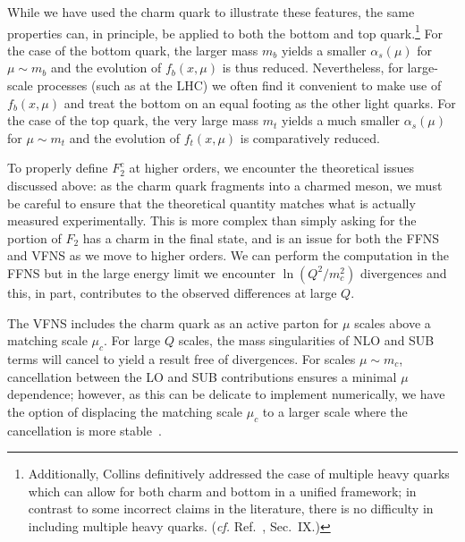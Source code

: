 %
While we have used the charm quark to illustrate these features, the
same properties can, in principle, be applied to both the bottom and
top quark.\footnote{Additionally, Collins definitively addressed the
  case of multiple heavy quarks which can allow for both charm and
  bottom in a unified framework; in contrast to some incorrect claims
  in the literature, there is no difficulty in including multiple
  heavy quarks. (\textit{cf.} Ref.~\cite{Collins:1998rz}, Sec.~IX.)}
For the case of the bottom quark, the larger mass $m_{b}$ yields a
smaller $\alpha_{s}(\mu)$ for $\mu\sim m_{b}$ and the evolution of
$f_{b}(x,\mu)$ is thus reduced. Nevertheless, for large-scale
processes (such as at the LHC) we often find it convenient to make use
of $f_{b}(x,\mu)$ and treat the bottom on an equal footing as the
other light quarks.
%
For the case of the top quark, the very large mass $m_{t}$ yields a
much smaller $\alpha_{s}(\mu)$ for $\mu\sim m_{t}$ and the evolution
of $f_{t}(x,\mu)$ is comparatively reduced.

%
To properly define $F_{2}^{c}$ at higher orders, we encounter the
theoretical issues discussed above: as the charm quark fragments into
a charmed meson, we must be careful to ensure that the theoretical
quantity matches what is actually measured experimentally.
%
This is more complex than simply asking for the portion of $F_{2}$
has a charm in the final state, and is an issue for both the FFNS
and VFNS as we move to higher orders.
%
We can perform the computation in the FFNS but in the large energy
limit we encounter $\ln(Q^{2}/m_{c}^{2})$ divergences and this, in
part, contributes to the observed differences at large $Q$.

The VFNS includes the charm quark as an active parton for $\mu$ scales
above a matching scale $\mu_{c}$. For large $Q$ scales, the mass
singularities of NLO and SUB terms will cancel to yield a result free of
divergences. For scales $\mu\sim m_{c}$, cancellation between the LO
and SUB contributions ensures a minimal $\mu$ dependence; however, as
this can be delicate to implement numerically, we have the option of
displacing the matching scale $\mu_{c}$ to a larger scale where the
cancellation is more stable~\cite{Bertone:2017ehk,Bertone:2018ids}.

